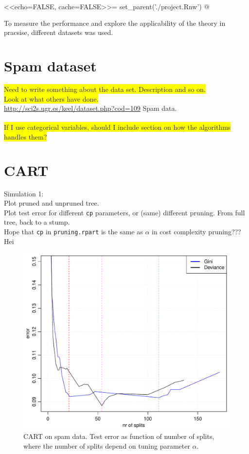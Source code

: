 <<echo=FALSE, cache=FALSE>>=
set_parent('./project.Rnw')
@

To measure the performance and explore the applicability of the theory in pracsise, different datasets was used. 

\section{Spam dataset}
\label{sec:Spam dataset}
\colorbox{yellow}{Need to write something about the data set. Description and so on.}\\
\colorbox{yellow}{Look at what others have done.} \\
\url{http://sci2s.ugr.es/keel/dataset.php?cod=109} Spam data.\\
\\
\colorbox{yellow}{If I use categorical variables, should I include section on how the algorithms handles them?}
 \cite{Spamdata}

\section{CART}
\label{sec:CARTsim}
Simulation 1: \\
Plot pruned and unpruned tree. \\
Plot test error for different \verb+cp+ parameters, or (same) different pruning. From full tree, back to a stump.\\
Hope that \verb+cp+ in \verb+pruning.rpart+ is the same as $\alpha$ in cost complexity pruning??? Hei

\begin{figure}[h!]
\begin{center}
    \includegraphics[scale=0.5]{./figures/cartCPSpam.pdf}
\end{center}
\caption{CART on spam data. Test error as function of number of splits, where the number of splits depend on tuning parameter $\alpha$.}
\label{fig:cartCPSpam}
\end{figure}

